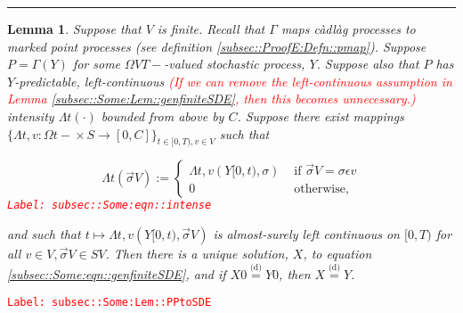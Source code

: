 \documentclass[12pt]{article}
\newcommand{\ra}{\rightarrow}
\newcommand{\te}{\text}
\newcommand{\ep}{\epsilon}
\newcommand{\tr}{\textcolor{red}}
\newcommand{\labe}[1]{\tr{\texttt{Label: #1}}}
\newcommand{\lin}{\rule{\linewidth}{0.4 pt}}
\newcommand{\deq}{\overset{\text{(d)}}{=}}			%
\renewcommand{\v}{v}							%
\renewcommand{\S}{S}							%
\newcommand{\s}{\sigma}							%
\newcommand{\sv}{\vec{\s}}						%
\newcommand{\ev}{\ep}							%
\newcommand{\T}{T}								%
\renewcommand{\t}{t}							%
\newcommand{\X}{X}								%
\newcommand{\const}{C}							%
\newcommand{\XX}{Y}								%
\newcommand{\pmap}{\Gamma}						%
\newcommand{\rp}{P}								%
\newcommand{\ratee}{\Lambda}					%
\newtheorem{lem}[thms]{Lemma}
\begin{document}
\lin

\begin{lem}
Suppose that \(V\) is finite. Recall that \(\pmap{}\) maps c\`adl\`ag processes to marked point processes (see definition \ref{subsec::ProofE:Defn::pmap}). Suppose \(\rp{} = \pmap{}(\XX{}{})\) for some \(\Omega{V}{\T-}\)-valued stochastic process, \(\XX{}{}\). Suppose also that \(\rp{}\) has \(\XX{}{}\)-predictable, left-continuous \tr{(If we can remove the left-continuous assumption in Lemma \ref{subsec::Some:Lem::genfiniteSDE}, then this becomes unnecessary.)} intensity \(\ratee{\t}(\cdot)\) bounded from above by \(\const{}\). Suppose there exist mappings \(\{\ratee{\t,\v}:\Omega{}{\t-}\times \S \ra [0,\const{}]\}_{\t\in[0,\T),\v\in V}\) such that 

\begin{equation}
\ratee{\t}(\sv{}{V}) := \begin{cases}
\ratee{\t,\v}(\XX{}{[0,\t)},\s) &\te{ if } \sv{}{V} = \s\ev{\v}\\
0 &\te{ otherwise,}
\end{cases}
\label{subsec::Some:eqn::intense}
\end{equation}
\labe{subsec::Some:eqn::intense}

and such that \(\t\mapsto \ratee{\t,\v}(\XX{}{[0,\t)},\sv{}{V})\) is almost-surely left continuous on \([0,\T)\) for all \(\v\in V,\sv{}{V}\in \S{V}\). Then there is a unique solution, \(\X{}{}\), to equation \eqref{subsec::Some:eqn::genfiniteSDE}, and if \(\X{}{0} \deq \XX{}{0}\), then \(\X{}{} \deq \XX{}{}\).

\label{subsec::Some:Lem::PPtoSDE}
\end{lem}
\labe{subsec::Some:Lem::PPtoSDE}
\end{document}
